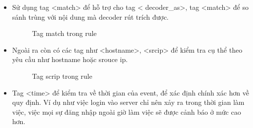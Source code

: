 \begin{itemize}
\begin{itemize}
      \item Sử dụng tag \textless match\textgreater{}  để hỗ trợ cho tag \textless
      decoder\_as\textgreater, tag \textless match\textgreater{}  để so sánh trùng với nội dung mà decoder rút trích được. 
      \begin{figure}[h!]
	\centering 
{}
	\caption{Tag match trong rule}
  \end{figure}
  	  \item Ngoài ra còn có các tag như \textless hostname\textgreater,
  	  \textless srcip\textgreater{}   để kiểm tra cụ thể theo yêu cầu như hostname hoặc srouce ip.
  	  \begin{figure}[h!]
	\centering 
{}
	\caption{Tag scrip trong rule}
  \end{figure}
      \item Tag \textless time\textgreater{}  để kiểm tra về thời gian của event, để xác định chính
      xác hơn về quy định. Ví dụ như việc login vào server chỉ nên xảy ra trong thời gian làm việc, việc mọi sự đăng nhập ngoài giờ làm việc sẽ được cảnh báo ở mức cao hơn.

\end{itemize}
\end{itemize}
